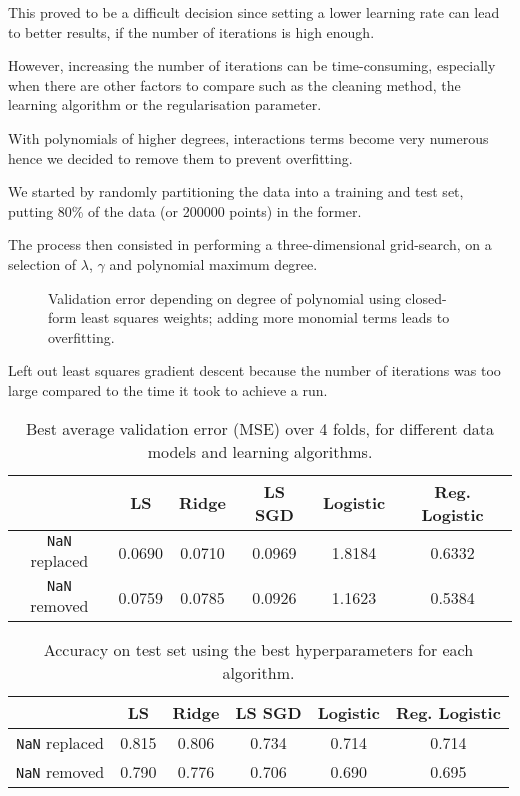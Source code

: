 \documentclass[10pt,conference,compsocconf]{IEEEtran}
\begin{document}
This proved to be a difficult decision since setting a lower learning rate can lead to better results,
if the number of iterations is high enough.

However, increasing the number of iterations can be
time-consuming, especially when there are other
factors to compare such as the cleaning method, the learning algorithm or 
the regularisation parameter.


With polynomials of higher degrees, interactions terms become very numerous hence we decided to remove them
to prevent overfitting.


We started by randomly partitioning the data into a training and test set,
putting 80\% of the data (or 200000 points) in the former.

The process then consisted in performing a three-dimensional grid-search, on a selection of $\lambda$, $\gamma$ and polynomial maximum degree.


\begin{figure}
  \centering
  
  \vspace{-3mm}
  \caption{Validation error depending on degree of polynomial using closed-form least squares weights; adding more monomial terms leads to overfitting.}
  \label{fig:overfitting}
\end{figure}

Left out least squares gradient descent because the number of iterations was too large compared to the time it took to achieve a run.


\begin{table}
  \begin{tabular}{ |c|c|c|c|c|c| } 
    \hline
     & LS & Ridge & LS SGD & Logistic & Reg. Logistic \\
    \hline
    \texttt{NaN} replaced & 0.0690 & 0.0710 & 0.0969 & 1.8184 & 0.6332 \\
    \texttt{NaN} removed  & 0.0759 & 0.0785 & 0.0926 & 1.1623 & 0.5384 \\
    \hline
  \end{tabular}

  \caption{Best average validation error (MSE) over 4 folds, for different data models and learning algorithms.}
  \label{tbl:validation}
\end{table}


\begin{table}
  \begin{tabular}{ |c|c|c|c|c|c| } 
    \hline
     & LS & Ridge & LS SGD & Logistic & Reg. Logistic \\
    \hline
    \texttt{NaN} replaced & 0.815 & 0.806 & 0.734 & 0.714 & 0.714 \\
    \texttt{NaN} removed  & 0.790 & 0.776 & 0.706 & 0.690 & 0.695 \\
    \hline
  \end{tabular}

  \caption{Accuracy on test set using the best hyperparameters for each algorithm.}
  \label{tbl:test-accuracies}
\end{table}
\end{document}
